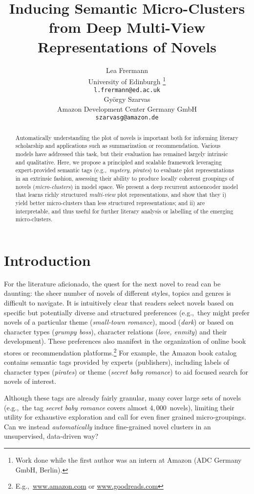 \documentclass[11pt,letterpaper]{article}
\title{Inducing Semantic Micro-Clusters from Deep Multi-View Representations of Novels}
\author{Lea Frermann \\
  University of Edinburgh \thanks{\quad Work done while the first author was an intern at Amazon (ADC Germany GmbH, Berlin).}\\
  {\tt  l.frermann@ed.ac.uk} \\\And
  Gy\"orgy Szarvas \\
  Amazon Development Center Germany GmbH \\
  {\tt szarvasg@amazon.de} \\
}
\begin{document}
\maketitle

\begin{abstract}
Automatically understanding the plot of novels is important both for informing literary scholarship and applications such as summarization or recommendation.
Various models have addressed this task, but their evaluation has remained largely intrinsic and qualitative. Here, we propose a principled and scalable framework leveraging expert-provided semantic tags (e.g.,~{\it mystery}, {\it pirates}) to evaluate plot representations in an extrinsic fashion, assessing their ability to produce locally coherent groupings of novels ({\it micro-clusters}) in model space. We present a deep recurrent autoencoder model that learns richly structured {\it multi-view} plot representations, and show that they i) yield better micro-clusters than less structured representations; and ii) are interpretable, and thus useful for further literary analysis or labelling of the emerging micro-clusters.
\end{abstract}


\section{Introduction}
For the literature aficionado, the quest for the next novel to read can be daunting: the sheer number of novels of different styles, topics and genres is difficult to navigate. It is intuitively clear that readers select novels based on specific but potentially diverse and structured preferences (e.g.,~they might prefer novels of a particular theme ({\it small-town romance}), mood ({\it dark}) or based on character types ({\it grumpy boss}), character relations ({\it love, enmity}) and their development). These preferences also manifest in the organization of online book stores or recommendation platforms.\footnote{E.g.,~\mbox{\url{www.amazon.com}} or \url{www.goodreads.com}} For example, the Amazon book catalog contains semantic tags provided by experts (publishers), including labels of character types ({\it pirates}) or theme ({\it secret baby romance}) to aid focused search for novels of interest. 

Although these tags are already fairly granular, many cover large sets of novels (e.g.,~the tag {\it secret baby romance} covers almost $4,000$~novels), limiting their utility for exhaustive exploration and call for even finer grained micro-groupings. %
Can we instead {\it automatically} induce fine-grained novel clusters in an unsupervised, data-driven way? 
\end{document}
